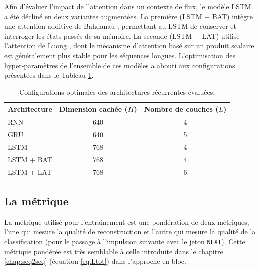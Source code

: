 Afin d'évaluer l'impact de l'attention dans un contexte de flux, le modèle LSTM a été décliné en deux variantes augmentées. La première (LSTM + BAT) intègre une attention additive de Bahdanau \cite{bahdanau_neural_2014}, permettant au LSTM de conserver et interroger les états passés de sa mémoire. La seconde (LSTM + LAT) utilise l'attention de Luong \cite{luong_effective_2015}, dont le mécanisme d'attention basé sur un produit scalaire est généralement plus stable pour les séquences longues. L'optimisation des hyper-paramètres de l'ensemble de ces modèles a abouti aux configurations présentées dans le Tableau \ref{tab:hypRNN}.

\begin{table}[htbp]
\centering
\begin{tabular}{l c c}
\toprule
\textbf{Architecture} & \textbf{Dimension cachée ($H$)} & \textbf{Nombre de couches ($L$)} \\
\midrule
RNN & 640 & 4 \\
GRU & 640 & 5 \\
LSTM & 768 & 4 \\
LSTM + BAT & 768 & 4 \\
LSTM + LAT & 768 & 6 \\
\bottomrule
\end{tabular}
\caption{Configurations optimales des architectures récurrentes évaluées.}
\label{tab:hypRNN}
\end{table}

\subsection{La métrique}
La métrique utilisé pour l'entrainement est une pondération de deux métriques, l'une qui mesure la qualité de reconstruction et l'autre qui mesure la qualité de la classification (pour le passage à l'impulsion suivante avec le jeton \texttt{NEXT}). Cette métrique pondérée est très semblable à celle introduite dans le chapitre \ref{chap:seq2seq} (équation \eqref{eq:Ltot}) dans l'approche en bloc. \\

